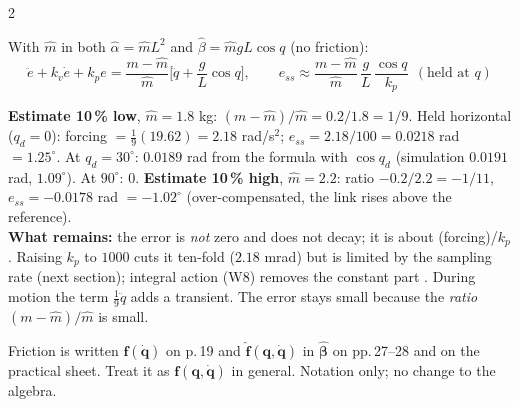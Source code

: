 \begin{multicols}{2}
\begin{deriv}
\end{deriv}
\begin{fbx}
With $\hat m$ in both $\hat\alpha=\hat mL^2$ and $\hat\beta=\hat mgL\cos q$ (no friction):
\[\ddot e+k_v\dot e+k_pe=\frac{m-\hat m}{\hat m}\Big[\ddot q+\frac gL\cos q\Big],\qquad e_{ss}\approx\frac{m-\hat m}{\hat m}\,\frac{g}{L}\,\frac{\cos q}{k_p}\ \ (\text{held at }q)\]
\end{fbx}
\begin{worked}[scenario: the mass is 10\,\% off; $m=2$ kg, $L=0.5$ m, $k_p=100$, $k_v=20$, $g/L=19.62$ s$^{-2}$]\label{w9:ten}
\textbf{Estimate 10\,\% low}, $\hat m=1.8$ kg: $(m-\hat m)/\hat m=0.2/1.8=1/9$. Held horizontal ($q_d=0$): forcing $=\tfrac19(19.62)=2.18$ rad/s$^2$; $e_{ss}=2.18/100=0.0218$ rad $=1.25^\circ$. At $q_d=30^\circ$: $0.0189$ rad from the formula with $\cos q_d$ (simulation $0.0191$ rad, $1.09^\circ$). At $90^\circ$: $0$. \textbf{Estimate 10\,\% high}, $\hat m=2.2$: ratio $-0.2/2.2=-1/11$, $e_{ss}=-0.0178$ rad $=-1.02^\circ$ (over-compensated, the link rises above the reference). \chk\\
\textbf{What remains:} the error is \emph{not} zero and does not decay; it is about (forcing)/$k_p$. Raising $k_p$ to $1000$ cuts it ten-fold ($2.18$ mrad) but is limited by the sampling rate (next section); integral action (W8) removes the constant part \added. During motion the term $\frac19\ddot q$ adds a transient. The error stays small because the \emph{ratio} $(m-\hat m)/\hat m$ is small.
\end{worked}
\begin{slideerr}[p.\,19 vs p.\,27]
Friction is written $\mathbf f(\dot{\mathbf q})$ on p.\,19 and $\hat{\mathbf f}(\mathbf q,\dot{\mathbf q})$ in $\hat{\boldsymbol\beta}$ on pp.\,27--28 and on the practical sheet. Treat it as $\mathbf f(\mathbf q,\dot{\mathbf q})$ in general. Notation only; no change to the algebra.
\end{slideerr}


\end{multicols}
